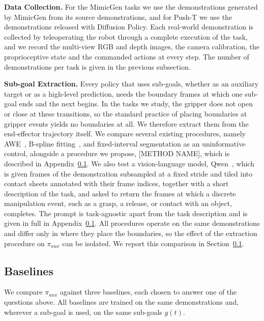 \documentclass[letterpaper, 10 pt, conference]{ieeeconf}  %
\begin{document}
\textbf{Data Collection.} For the MimicGen tasks we use the demonstrations generated by MimicGen from its source demonstrations, and for Push-T we use the demonstrations released with Diffusion Policy. Each real-world demonstration is collected by teleoperating the robot through a complete execution of the task, and we record the multi-view RGB and depth images, the camera calibration, the proprioceptive state and the commanded actions at every step. The number of demonstrations per task is given in the previous subsection.

\textbf{Sub-goal Extraction.} Every policy that uses sub-goals, whether as an auxiliary target or as a high-level prediction, needs the boundary frames at which one sub-goal ends and the next begins. In the tasks we study, the gripper does not open or close at these transitions, so the standard practice of placing boundaries at gripper events yields no boundaries at all. We therefore extract them from the end-effector trajectory itself. We compare several existing procedures, namely AWE~\cite{}, B-spline fitting~\cite{}, and fixed-interval segmentation as an uninformative control, alongside a procedure we propose, [METHOD NAME], which is described in Appendix~\ref{}. We also test a vision-language model, Qwen~\cite{}, which is given frames of the demonstration subsampled at a fixed stride and tiled into contact sheets annotated with their frame indices, together with a short description of the task, and asked to return the frames at which a discrete manipulation event, such as a grasp, a release, or contact with an object, completes. The prompt is task-agnostic apart from the task description and is given in full in Appendix~\ref{}. All procedures operate on the same demonstrations and differ only in where they place the boundaries, so the effect of the extraction procedure on $\pi_{aux}$ can be isolated. We report this comparison in Section~\ref{}.

\subsection{Baselines}

We compare $\pi_{aux}$ against three baselines, each chosen to answer one of the questions above. All baselines are trained on the same demonstrations and, wherever a sub-goal is used, on the same sub-goals $g(t)$.
\end{document}
